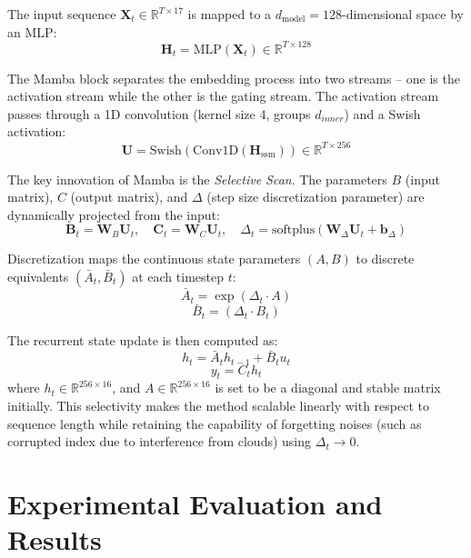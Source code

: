 \documentclass[conference]{IEEEtran}
\begin{document}
The input sequence $\mathbf{X}_t \in \mathbb{R}^{T \times 17}$ is mapped to a $d_{\text{model}} = 128$-dimensional space by an MLP:
\begin{equation}
\mathbf{H}_t = \text{MLP}(\mathbf{X}_t) \in \mathbb{R}^{T \times 128}
\end{equation}

The Mamba block separates the embedding process into two streams -- one is the activation stream while the other is the gating stream. The activation stream passes through a 1D convolution (kernel size 4, groups $d_{inner}$) and a Swish activation:
\begin{equation}
\mathbf{U} = \text{Swish}(\text{Conv1D}(\mathbf{H}_{\text{ssm}})) \in \mathbb{R}^{T \times 256}
\end{equation}

The key innovation of Mamba is the \textit{Selective Scan}. The parameters $B$ (input matrix), $C$ (output matrix), and $\Delta$ (step size discretization parameter) are dynamically projected from the input:
\begin{equation}
\mathbf{B}_t = \mathbf{W}_B \mathbf{U}_t, \quad \mathbf{C}_t = \mathbf{W}_C \mathbf{U}_t, \quad \Delta_t = \text{softplus}(\mathbf{W}_{\Delta} \mathbf{U}_t + \mathbf{b}_{\Delta})
\end{equation}

Discretization maps the continuous state parameters $(A, B)$ to discrete equivalents $(\bar{A}_t, \bar{B}_t)$ at each timestep $t$:
\begin{equation}
\bar{A}_t = \exp(\Delta_t \cdot A)
\end{equation}
\begin{equation}
\bar{B}_t = (\Delta_t \cdot B_t)
\end{equation}

The recurrent state update is then computed as:
\begin{equation}
h_t = \bar{A}_t h_{t-1} + \bar{B}_t u_t
\end{equation}
\begin{equation}
y_t = C_t h_t
\end{equation}
where $h_t \in \mathbb{R}^{256 \times 16}$, and $A \in \mathbb{R}^{256 \times 16}$ is set to be a diagonal and stable matrix initially. This selectivity makes the method scalable linearly with respect to sequence length while retaining the capability of forgetting noises (such as corrupted index due to interference from clouds) using $\Delta_t \to 0$.

\section{Experimental Evaluation and Results}
\end{document}
